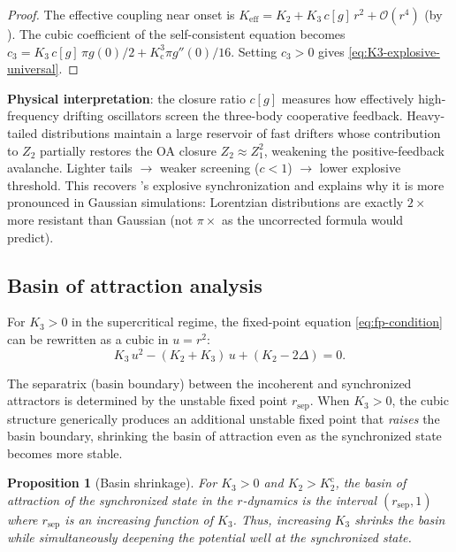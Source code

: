 \documentclass{article}
\newtheorem{proposition}{Proposition}
\newcommand{\Order}{\mathcal{O}}
\newcommand{\Kc}{K_{\mathrm{c}}}
\begin{document}
\begin{proof}
  The effective coupling near onset is $K_{\mathrm{eff}} = K_2 + K_3\,c[g]\,r^2
  + \Order(r^4)$ (by ).  The cubic coefficient of the
  self-consistent equation becomes $c_3 = K_3\,c[g]\,\pi g(0)/2 +
  \Kc^3\pi g''(0)/16$.  Setting $c_3>0$ gives
  \eqref{eq:K3-explosive-universal}.
\end{proof}

\textbf{Physical interpretation}: the closure ratio $c[g]$ measures how
effectively high-frequency drifting oscillators screen the three-body
cooperative feedback.  Heavy-tailed distributions maintain a large reservoir
of fast drifters whose contribution to $Z_2$ partially restores the OA
closure $Z_2\!\approx\!Z_1^2$, weakening the positive-feedback avalanche.
Lighter tails $\to$ weaker screening ($c<1$) $\to$ lower explosive threshold.
This recovers \citet{Skardal2020}'s explosive synchronization and explains
why it is more pronounced in Gaussian simulations: Lorentzian distributions
are exactly $2\times$ more resistant than Gaussian (not $\pi\times$ as
the uncorrected formula would predict).

\subsection{Basin of attraction analysis}

For $K_3>0$ in the supercritical regime, the fixed-point equation
\eqref{eq:fp-condition} can be rewritten as a cubic in $u=r^2$:
\begin{equation}
  K_3\,u^2 - (K_2+K_3)\,u + (K_2 - 2\Delta) = 0.
  \label{eq:cubic-u}
\end{equation}

The separatrix (basin boundary) between the incoherent and synchronized
attractors is determined by the unstable fixed point $r_{\mathrm{sep}}$.
When $K_3>0$, the cubic structure generically produces an additional unstable
fixed point that \emph{raises} the basin boundary, shrinking the basin of
attraction even as the synchronized state becomes more stable.

\begin{proposition}[Basin shrinkage]
\label{prop:basin-shrink}
  For $K_3>0$ and $K_2>K_2^{\mathrm{c}}$, the basin of attraction of the
  synchronized state in the $r$-dynamics is the interval
  $(r_{\mathrm{sep}}, 1)$ where $r_{\mathrm{sep}}$ is an increasing function
  of $K_3$.  Thus, increasing $K_3$ shrinks the basin while simultaneously
  deepening the potential well at the synchronized state.
\end{proposition}
\end{document}
